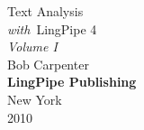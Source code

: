 \cleardoublepage
\pagestyle{empty}
\vspace*{1in}
\begin{center}
{\hfill \fontsize{45}{65}\selectfont Text Analysis \\[18pt] \hfill {\fontsize{30}{45}\it with}\  LingPipe 4}
\\[0.4in]
{\hfill\fontsize{25}{42}\it Volume I\hspace*{8pt}}
\\[1in]
{\hfill\Huge Bob Carpenter}
\\[-1pt]
\vfill
{\hfill \large\bf LingPipe Publishing}
\\[1pt]
{\hfill \small New York}
\\[-1pt]
{\hfill \small 2010}
\end{center}
